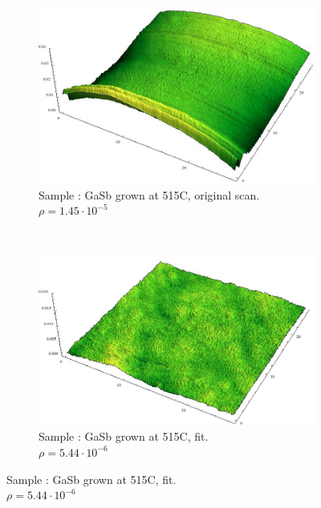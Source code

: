 \begin{figure}
    \begin{subfigure}{0.4\columnwidth}
         \includegraphics[width=\textwidth]{Bilder/s3_gasb_515c_orig.jpg}
         \caption{Sample : GaSb grown at 515\textdegree C, original 
         scan.
         $\rho = 1.45 \cdot 10^{-5}$}
        \label{s3_orig}
    \end{subfigure}
    ~
    \begin{subfigure}{0.4\columnwidth}
         \includegraphics[width=\textwidth]{Bilder/s3_gasb_515c_f.jpg}
         \caption{Sample : GaSb grown at 515\textdegree C, fit. \\
         $\rho = 5.44 \cdot 10^{-6}$}
        \label{s3_flat}
    \end{subfigure}
    

\end{figure}
